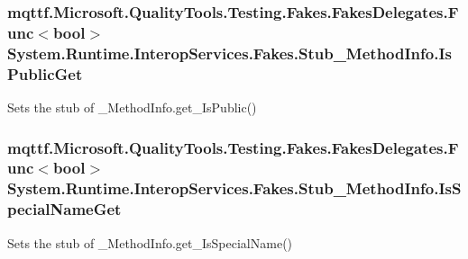 \hypertarget{class_system_1_1_runtime_1_1_interop_services_1_1_fakes_1_1_stub___method_info_a5c17ec9f509042172a4515d3386864d9}{
\subsubsection[{Is\-Public\-Get}]{\setlength{\rightskip}{0pt plus 5cm}mqttf.\-Microsoft.\-Quality\-Tools.\-Testing.\-Fakes.\-Fakes\-Delegates.\-Func$<$bool$>$ System.\-Runtime.\-Interop\-Services.\-Fakes.\-Stub\-\_\-\-Method\-Info.\-Is\-Public\-Get}}\label{class_system_1_1_runtime_1_1_interop_services_1_1_fakes_1_1_stub___method_info_a5c17ec9f509042172a4515d3386864d9}


Sets the stub of \-\_\-\-Method\-Info.\-get\-\_\-\-Is\-Public()

\hypertarget{class_system_1_1_runtime_1_1_interop_services_1_1_fakes_1_1_stub___method_info_a0a6977f6469066c87e3bb980c9af8c5b}{
\subsubsection[{Is\-Special\-Name\-Get}]{\setlength{\rightskip}{0pt plus 5cm}mqttf.\-Microsoft.\-Quality\-Tools.\-Testing.\-Fakes.\-Fakes\-Delegates.\-Func$<$bool$>$ System.\-Runtime.\-Interop\-Services.\-Fakes.\-Stub\-\_\-\-Method\-Info.\-Is\-Special\-Name\-Get}}\label{class_system_1_1_runtime_1_1_interop_services_1_1_fakes_1_1_stub___method_info_a0a6977f6469066c87e3bb980c9af8c5b}


Sets the stub of \-\_\-\-Method\-Info.\-get\-\_\-\-Is\-Special\-Name()


